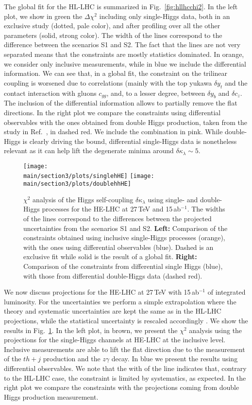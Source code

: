 The global fit for the HL-LHC is summarized in Fig.~\ref{fig:hllhcchi2}. In the left plot, we show in green the $\Delta\chi^2$ including only single-Higgs data, both in an exclusive study (dotted, pale color), and after profiling over all the other parameters (solid, strong color). The width of the lines correspond to the difference between the scenarios S1 and S2. The fact that the lines are not very separated means that the constraints are mostly statistics dominated. In orange, we consider only inclusive measurements, while in blue we include the differential information. We can see that, in a global fit, the constraint on the trilinear coupling is worsened due to correlations (mainly with the top yukawa $\delta y_t$ and the contact interaction with gluons $c_{gg}$, and, to a lesser degree, between $\delta y_b$ and $\delta c_z$. The inclusion of the differential information allows to partially remove the flat directions. In the right plot we compare the constraints using differential observables with the ones obtained from double Higgs production, taken from the study in Ref.~\cite{Azatov:2015oxa}, in dashed red. We include the combination in pink. While double-Higgs is clearly driving the bound, differential single-Higgs data is nonetheless relevant as it can help lift the degenerate minima around $\delta \kappa_\lambda\sim 5$.
\medskip

\begin{figure}
	\centering
	\texttt{[image: \\main/section3/plots/singlehHE]}\hfill
	\texttt{[image: \\main/section3/plots/doublehhHE]}
	\caption{$\chi^2$ analysis of the Higgs self-coupling $\delta \kappa_\lambda$ using single- and double-Higgs processes for the HE-LHC at 27\,TeV and 15\,ab$^{-1}$. The widths of the lines correspond to the differences between the projected uncertainties from the scenarios S1 and S2. \textbf{Left:} Comparison of the constraints obtained using inclusive single-Higgs processes (orange), with the ones using differential observables (blue). Dashed is an exclusive fit while solid is the result of a global fit. \textbf{Right:} Comparison of the constraints from differential single Higgs (blue), with those from differential double-Higgs data (dashed red).}
	\label{fig:helhcchi2}
\end{figure}	


We now discuss projections for the HE-LHC at 27\,TeV with 15\,ab$^{-1}$ of integrated luminosity. For the uncertainties we perform a simple extrapolation where the theory and systematic uncertainties are kept the same as in the HL-LHC projections, while the statistical uncertainty is rescaled accordingly \cite{Goncalves:2018qas}. We show the results in Fig.~\ref{fig:helhcchi2}. In the left plot, in brown, we present the $\chi^2$ analysis using the projections for the single-Higgs channels at HE-LHC at the inclusive level. Inclusive measurements are able to lift the flat direction due to the measurement of the $th+j$ production and the $z\gamma$ decay. In blue we present the results using differential observables. We note that the with of the line indicates that, contrary to the HL-LHC case, the constraint is limited by systematics, as expected. In the right plot we compare the constraints with the projections coming from double Higgs production measurement.
\medskip